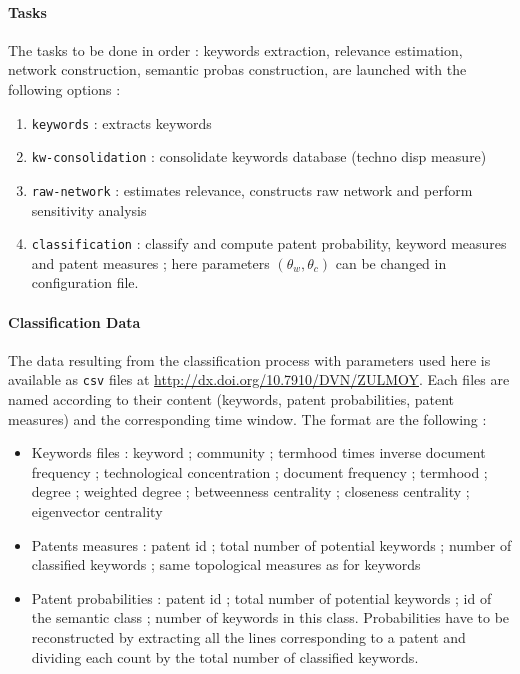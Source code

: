 \documentclass[article]{article}%
\begin{document}
\paragraph{Tasks}

The tasks to be done in order : keywords extraction, relevance estimation, network construction, semantic probas construction, are launched with the following options :

\begin{enumerate}
\item \texttt{keywords} : extracts keywords
\item \texttt{kw-consolidation} : consolidate keywords database (techno disp measure)
\item \texttt{raw-network} : estimates relevance, constructs raw network and perform sensitivity analysis
\item \texttt{classification} : classify and compute patent probability, keyword measures and patent measures ; here parameters $(\theta_w,\theta_c)$ can be changed in configuration file.
\end{enumerate}



\paragraph{Classification Data}

The data resulting from the classification process with parameters used here is available as \texttt{csv} files at \url{http://dx.doi.org/10.7910/DVN/ZULMOY}. Each files are named according to their content (keywords, patent probabilities, patent measures) and the corresponding time window. The format are the following :

\begin{itemize}
\item Keywords files : keyword ; community ; termhood times inverse document frequency ; technological concentration ; document frequency ; termhood ; degree ; weighted degree ; betweenness centrality ; closeness centrality ; eigenvector centrality
\item Patents measures : patent id ; total number of potential keywords ; number of classified keywords ; same topological measures as for keywords
\item Patent probabilities : patent id ; total number of potential keywords ; id of the semantic class ; number of keywords in this class. Probabilities have to be reconstructed by extracting all the lines corresponding to a patent and dividing each count by the total number of classified keywords.
\end{itemize}
\end{document}
